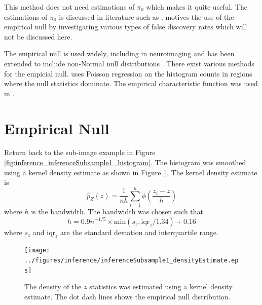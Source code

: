 This method does not need estimations of $\pi_0$ which makes it quite useful. The estimations of $\pi_0$ is discussed in literature such as \cite{benjamini2000adaptive, pounds2003estimating, storey2003statistical, pounds2004improving, langaas2005estimating, durnez2014posthoc}. \cite{efron2004large} motives the use of the empirical null by investigating various types of false discovery rates \citep{storey2002direct, storey2003positive, efron2002empirical, efron2007size} which will not be discussed here.

The empirical null is used widely, including in neuroimaging \citep{schwartzman2008false, schwartzman2009empirical} and has been extended to include non-Normal null distributions \citep{schwartzman2008false, schwartzman2008empirical}. There exist various methods for the empicial null. \citep{schwartzman2008empirical} uses Poisson regression on the histogram counts in regions where the null statistics dominate. The empirical characteristic function was used in \citep{jin2007estimating}.

\section{Empirical Null}

Return back to the sub-image example in Figure \ref{fig:inference_inferenceSubsample1_histogram}. The histogram was smoothed using a kernel density estimate \citep{parzen1962on, friedman2001elements} as shown in Figure \ref{fig:inference_inferenceSubsample1_densityEstimate}. The kernel density estimate \citep{parzen1962on} is
\begin{equation}
  \widehat{p}_Z(z)=
  \frac{1}{nh}
  \sum_{i=1}^n\phi\left(
    \dfrac{z_i-z}{h}
  \right)
  \label{eq:inference_kernel_density_estimate}
\end{equation}
where $h$ is the bandwidth. The bandwidth was chosen such that
\begin{equation}
  h = 0.9n^{-1/5}\times\text{min}\left(s_z,\text{iqr}_z/1.34\right) + 0.16
  \label{eq:inference_ourruleofthumb}
\end{equation}
where $s_z$ and $\text{iqr}_z$ are the standard deviation and interquartile range.

\begin{figure}
  \centering
  \texttt{[image: ../figures/inference/inferenceSubsample1\_densityEstimate.eps]}
  \caption{The density of the $z$ statistics was estimated using a kernel density estimate. The dot dash lines shows the empirical null distribution.}
  \label{fig:inference_inferenceSubsample1_densityEstimate}
\end{figure}

